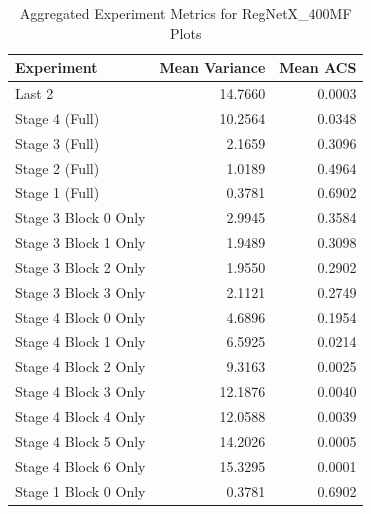 \begin{table}
\caption{Aggregated Experiment Metrics for RegNetX_400MF Plots}
\label{tab:exp_plot_data_regnetx_400mf}
\begin{tabular}{lrr}
\toprule
Experiment & Mean Variance & Mean ACS \\
\midrule
Last 2 & 14.7660 & 0.0003 \\
Stage 4 (Full) & 10.2564 & 0.0348 \\
Stage 3 (Full) & 2.1659 & 0.3096 \\
Stage 2 (Full) & 1.0189 & 0.4964 \\
Stage 1 (Full) & 0.3781 & 0.6902 \\
Stage 3 Block 0 Only & 2.9945 & 0.3584 \\
Stage 3 Block 1 Only & 1.9489 & 0.3098 \\
Stage 3 Block 2 Only & 1.9550 & 0.2902 \\
Stage 3 Block 3 Only & 2.1121 & 0.2749 \\
Stage 4 Block 0 Only & 4.6896 & 0.1954 \\
Stage 4 Block 1 Only & 6.5925 & 0.0214 \\
Stage 4 Block 2 Only & 9.3163 & 0.0025 \\
Stage 4 Block 3 Only & 12.1876 & 0.0040 \\
Stage 4 Block 4 Only & 12.0588 & 0.0039 \\
Stage 4 Block 5 Only & 14.2026 & 0.0005 \\
Stage 4 Block 6 Only & 15.3295 & 0.0001 \\
Stage 1 Block 0 Only & 0.3781 & 0.6902 \\
\bottomrule
\end{tabular}
\end{table}
